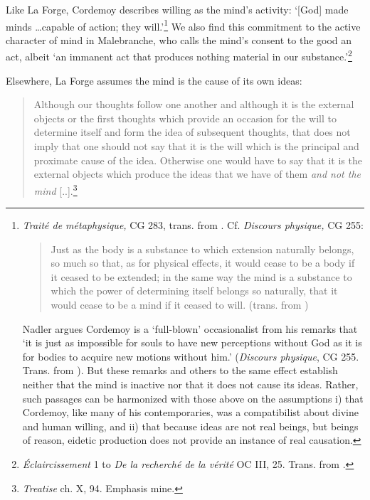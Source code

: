 \documentclass[]{article}
\begin{document}
Like La Forge, Cordemoy describes willing as the mind's activity: `{[}God{]} made minds \ldots capable of action; they will.'\footnote{\emph{Traité de métaphysique,} CG 283, trans. from \autocite[52]{Nadler2005}. Cf. \emph{Discours physique,} CG 255:
	
	\begin{quote}
		Just as the body is a substance to which extension naturally belongs, so much so that, as for physical effects, it would cease to be a body if it ceased to be extended; in the same way the mind is a substance to which the power of determining itself belongs so naturally, that it would cease to be a mind if it ceased to will. (trans. from \autocite[47]{Nadler2005})
	\end{quote}
	
	Nadler argues Cordemoy is a `full-blown' occasionalist from his remarks that `it is just as impossible for souls to have new perceptions without God as it is for bodies to acquire new motions without him.' (\emph{Discours physique}, CG 255. Trans. from \autocite[50]{Nadler2005}). But these remarks and others to the same effect establish neither that the mind is inactive nor that it does not cause its ideas. Rather, such passages can be harmonized with those above on the assumptions i) that Cordemoy, like many of his contemporaries, was a compatibilist about divine and human willing, and ii) that because ideas are not real beings, but beings of reason, eidetic production does not provide an instance of real causation.} We also find this commitment to the active character of mind in Malebranche, who calls the mind's consent to the good an act, albeit `an immanent act that produces nothing material in our substance.'\footnote{\emph{Éclaircissement} 1 to \emph{De la recherché de la vérité} OC III, 25. Trans. from \autocite[52]{Nadler2005}.}

Elsewhere, La Forge assumes the mind is the cause of its own ideas:

\begin{quote}
	Although our thoughts follow one another and although it is the external objects or the first thoughts which provide an occasion for the will to determine itself and form the idea of subsequent thoughts, that does not imply that one should not say that it is the will which is the principal and proximate cause of the idea. Otherwise one would have to say that it is the external objects which produce the ideas that we have of them \emph{and not the mind} {[}..{]}.\footnote{\emph{Treatise} ch. X, 94. Emphasis mine.}
\end{quote}
\end{document}
